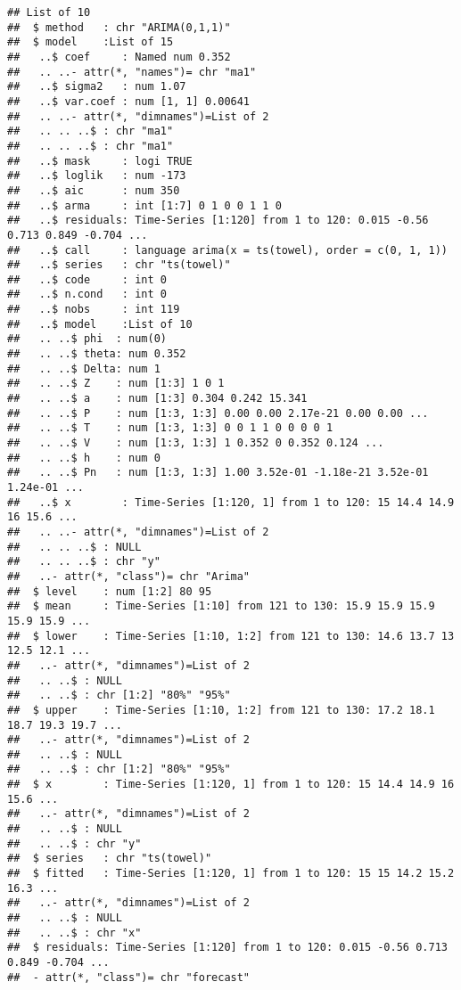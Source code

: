 \documentclass[
]{article}
\newenvironment{Shaded}{\begin{snugshade}}{\end{snugshade}}
\newcommand{\DecValTok}[1]{\textcolor[rgb]{0.00,0.00,0.81}{#1}}
\newcommand{\NormalTok}[1]{#1}
\newcommand{\SpecialCharTok}[1]{\textcolor[rgb]{0.81,0.36,0.00}{\textbf{#1}}}
\begin{document}
\begin{verbatim}
## List of 10
##  $ method   : chr "ARIMA(0,1,1)"
##  $ model    :List of 15
##   ..$ coef     : Named num 0.352
##   .. ..- attr(*, "names")= chr "ma1"
##   ..$ sigma2   : num 1.07
##   ..$ var.coef : num [1, 1] 0.00641
##   .. ..- attr(*, "dimnames")=List of 2
##   .. .. ..$ : chr "ma1"
##   .. .. ..$ : chr "ma1"
##   ..$ mask     : logi TRUE
##   ..$ loglik   : num -173
##   ..$ aic      : num 350
##   ..$ arma     : int [1:7] 0 1 0 0 1 1 0
##   ..$ residuals: Time-Series [1:120] from 1 to 120: 0.015 -0.56 0.713 0.849 -0.704 ...
##   ..$ call     : language arima(x = ts(towel), order = c(0, 1, 1))
##   ..$ series   : chr "ts(towel)"
##   ..$ code     : int 0
##   ..$ n.cond   : int 0
##   ..$ nobs     : int 119
##   ..$ model    :List of 10
##   .. ..$ phi  : num(0) 
##   .. ..$ theta: num 0.352
##   .. ..$ Delta: num 1
##   .. ..$ Z    : num [1:3] 1 0 1
##   .. ..$ a    : num [1:3] 0.304 0.242 15.341
##   .. ..$ P    : num [1:3, 1:3] 0.00 0.00 2.17e-21 0.00 0.00 ...
##   .. ..$ T    : num [1:3, 1:3] 0 0 1 1 0 0 0 0 1
##   .. ..$ V    : num [1:3, 1:3] 1 0.352 0 0.352 0.124 ...
##   .. ..$ h    : num 0
##   .. ..$ Pn   : num [1:3, 1:3] 1.00 3.52e-01 -1.18e-21 3.52e-01 1.24e-01 ...
##   ..$ x        : Time-Series [1:120, 1] from 1 to 120: 15 14.4 14.9 16 15.6 ...
##   .. ..- attr(*, "dimnames")=List of 2
##   .. .. ..$ : NULL
##   .. .. ..$ : chr "y"
##   ..- attr(*, "class")= chr "Arima"
##  $ level    : num [1:2] 80 95
##  $ mean     : Time-Series [1:10] from 121 to 130: 15.9 15.9 15.9 15.9 15.9 ...
##  $ lower    : Time-Series [1:10, 1:2] from 121 to 130: 14.6 13.7 13 12.5 12.1 ...
##   ..- attr(*, "dimnames")=List of 2
##   .. ..$ : NULL
##   .. ..$ : chr [1:2] "80%" "95%"
##  $ upper    : Time-Series [1:10, 1:2] from 121 to 130: 17.2 18.1 18.7 19.3 19.7 ...
##   ..- attr(*, "dimnames")=List of 2
##   .. ..$ : NULL
##   .. ..$ : chr [1:2] "80%" "95%"
##  $ x        : Time-Series [1:120, 1] from 1 to 120: 15 14.4 14.9 16 15.6 ...
##   ..- attr(*, "dimnames")=List of 2
##   .. ..$ : NULL
##   .. ..$ : chr "y"
##  $ series   : chr "ts(towel)"
##  $ fitted   : Time-Series [1:120, 1] from 1 to 120: 15 15 14.2 15.2 16.3 ...
##   ..- attr(*, "dimnames")=List of 2
##   .. ..$ : NULL
##   .. ..$ : chr "x"
##  $ residuals: Time-Series [1:120] from 1 to 120: 0.015 -0.56 0.713 0.849 -0.704 ...
##  - attr(*, "class")= chr "forecast"
\end{verbatim}

\begin{Shaded}
\end{Shaded}
\end{document}
